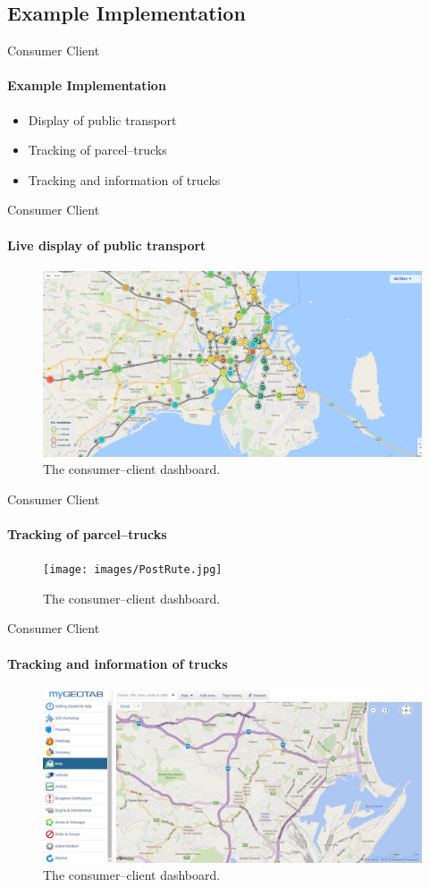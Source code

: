\subsection{Example Implementation}

\begin{frame}{Consumer Client}
    \framesubtitle{Example Implementation}

    \begin{itemize}
        \item Display of public transport
        \item Tracking of parcel--trucks
        \item Tracking and information of trucks
    \end{itemize}
\end{frame}

\begin{frame}{Consumer Client}
    \framesubtitle{Live display of public transport}

    \begin{figure}[h]
        \centering
        \includegraphics[scale=0.2]{images/RejseplanenLivemap.png}
        \caption{The consumer--client dashboard.}
    \end{figure}
\end{frame}

\begin{frame}{Consumer Client}
    \framesubtitle{Tracking of parcel--trucks}

    \begin{figure}[h]
        \centering
        \texttt{[image: images/PostRute.jpg]}
        \caption{The consumer--client dashboard.}
    \end{figure}
\end{frame}

\begin{frame}{Consumer Client}
    \framesubtitle{Tracking and information of trucks}

    \begin{figure}[h]
        \centering
        \includegraphics[scale=0.2]{images/mygeotab-map-view-without-traffic-overlay.jpg}
        \caption{The consumer--client dashboard.}
    \end{figure}
\end{frame}
